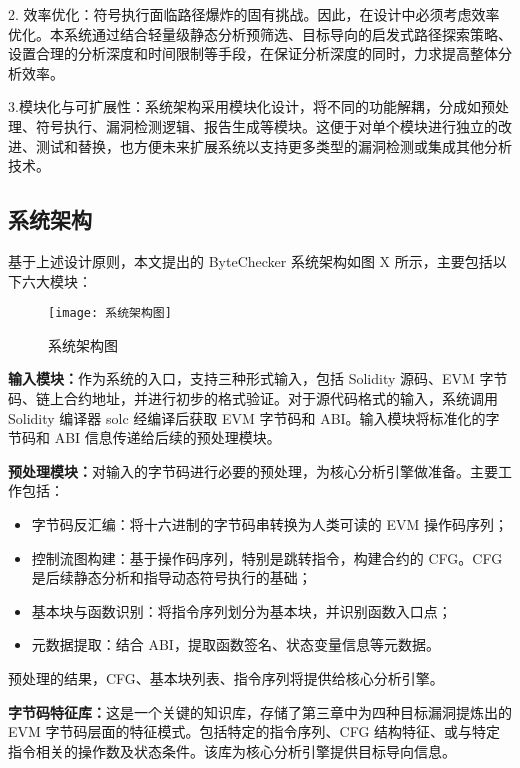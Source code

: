 \documentclass[print, master, vlined, timesmath]{DissertUESTC}
\begin{document}
2. 效率优化：符号执行面临路径爆炸的固有挑战。因此，在设计中必须考虑效率优化。本系统通过结合轻量级静态分析预筛选、目标导向的启发式路径探索策略、设置合理的分析深度和时间限制等手段，在保证分析深度的同时，力求提高整体分析效率。

3.模块化与可扩展性：系统架构采用模块化设计，将不同的功能解耦，分成如预处理、符号执行、漏洞检测逻辑、报告生成等模块。这便于对单个模块进行独立的改进、测试和替换，也方便未来扩展系统以支持更多类型的漏洞检测或集成其他分析技术。

\subsection{系统架构}

基于上述设计原则，本文提出的 ByteChecker 系统架构如图 X 所示，主要包括以下六大模块：

\begin{figure}[htbp]
    \centering
    \texttt{[image: 系统架构图]}
    \caption{系统架构图}
    \label{fig:系统架构图}
\end{figure}


\textbf{输入模块：}作为系统的入口，支持三种形式输入，包括 Solidity 源码、EVM 字节码、链上合约地址，并进行初步的格式验证。对于源代码格式的输入，系统调用 Solidity 编译器 solc 经编译后获取 EVM 字节码和 ABI。输入模块将标准化的字节码和 ABI 信息传递给后续的预处理模块。

\textbf{预处理模块：}对输入的字节码进行必要的预处理，为核心分析引擎做准备。主要工作包括： 

\begin{itemize}
    \item 字节码反汇编：将十六进制的字节码串转换为人类可读的 EVM 操作码序列；
    \item 控制流图构建：基于操作码序列，特别是跳转指令，构建合约的 CFG。CFG 是后续静态分析和指导动态符号执行的基础；
    \item 基本块与函数识别：将指令序列划分为基本块，并识别函数入口点；
    \item 元数据提取：结合 ABI，提取函数签名、状态变量信息等元数据。
\end{itemize}
预处理的结果，CFG、基本块列表、指令序列将提供给核心分析引擎。

\textbf{字节码特征库：}这是一个关键的知识库，存储了第三章中为四种目标漏洞提炼出的 EVM 字节码层面的特征模式。包括特定的指令序列、CFG 结构特征、或与特定指令相关的操作数及状态条件。该库为核心分析引擎提供目标导向信息。
\end{document}
